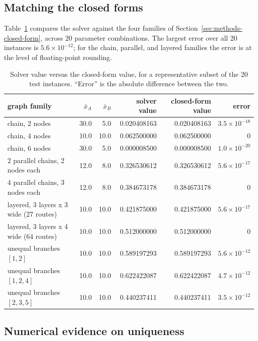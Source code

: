 \documentclass[11pt,a4paper]{article}
\theoremstyle{plain}
\theoremstyle{definition}
\newcommand{\XA}{\bar{x}_A}
\newcommand{\XB}{\bar{x}_B}
\begin{document}
\subsection{Matching the closed forms}
\label{sec:results-closed}

Table~\ref{tab:e1} compares the solver against the four families of
Section~\ref{sec:methods-closed-form}, across 20 parameter combinations.
The largest error over all 20 instances is $5.6\times10^{-12}$; for the
chain, parallel, and layered families the error is at the level of
floating-point rounding.

\begin{table}[htbp]
\centering
\caption{Solver value versus the closed-form value, for a representative
subset of the 20 test instances. ``Error'' is the absolute difference
between the two.}
\label{tab:e1}
\small
\begin{tabular}{lrrrrr}
\toprule
graph family & $\XA$ & $\XB$ & solver value & closed-form value & error \\
\midrule
chain, 2 nodes            & 30.0 & 5.0  & 0.020408163 & 0.020408163 & $3.5\times10^{-18}$\\
chain, 4 nodes             & 10.0 & 10.0 & 0.062500000 & 0.062500000 & $0$\\
chain, 6 nodes             & 30.0 & 5.0  & 0.000008500 & 0.000008500 & $1.0\times10^{-20}$\\
2 parallel chains, 2 nodes each  & 12.0 & 8.0 & 0.326530612 & 0.326530612 & $5.6\times10^{-17}$\\
4 parallel chains, 3 nodes each  & 12.0 & 8.0 & 0.384673178 & 0.384673178 & $0$\\
layered, 3 layers x 3 wide (27 routes) & 10.0 & 10.0 & 0.421875000 & 0.421875000 & $5.6\times10^{-17}$\\
layered, 3 layers x 4 wide (64 routes) & 10.0 & 10.0 & 0.512000000 & 0.512000000 & $0$\\
unequal branches $[1,2]$    & 10.0 & 10.0 & 0.589197293 & 0.589197293 & $5.6\times10^{-12}$\\
unequal branches $[1,2,4]$  & 10.0 & 10.0 & 0.622422087 & 0.622422087 & $4.7\times10^{-12}$\\
unequal branches $[2,3,5]$  & 10.0 & 10.0 & 0.440237411 & 0.440237411 & $3.5\times10^{-12}$\\
\bottomrule
\end{tabular}
\end{table}

\subsection{Numerical evidence on uniqueness}
\label{sec:results-uniqueness}
\end{document}

